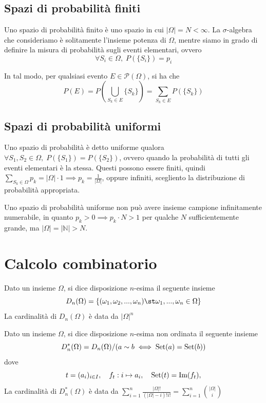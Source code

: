         \subsection{Spazi di probabilità finiti}
            Uno spazio di probabilità finito è uno spazio in cui $|\Omega| = N < \infty$.
            La $\sigma$-algebra che consideriamo è solitamente l'insieme potenza di $\Omega$, mentre siamo in grado di definire la misura di probabilità sugli eventi elementari, ovvero
            \[
                \forall S_{i} \in \Omega, \; P(\{S_{i}\}) = p_{i}
            \]

            In tal modo, per qualsiasi evento $E \in \mathcal{P}(\Omega)$, si ha che
            \[
                P(E) = P\left(\bigcup_{S_{k} \in E} \{S_{k}\}\right) = \sum_{S_{k} \in E} P(\{S_{k}\})
            \]

        \subsection{Spazi di probabilità uniformi}
            Uno spazio di probabilità è detto uniforme qualora $\forall S_{1}, S_{2} \in \Omega, \; P(\{S_{1}\}) = P(\{S_{2}\})$, ovvero quando la probabilità di tutti gli eventi elementari è la stessa.
            Questi possono essere finiti, quindi $\sum_{S_{k} \in \Omega} p_{k} = |\Omega| \cdot 1 \implies p_{k} = \frac{1}{|\Omega|}$, oppure infiniti, scegliento la distribuzione di probabilità appropriata.

            Uno spazio di probabilità uniforme non può avere insieme campione infinitamente numerabile, in quanto $p_{k} > 0 \implies p_{k} \cdot N > 1$ per qualche $N$ sufficientemente grande, ma $|\Omega| = |\mathbb{N}| > N$.



    \section{Calcolo combinatorio}
        \begin{definition}[Disposizione]
            Dato un insieme $\Omega$, si dice disposizione $n$-esima il seguente insieme
            \[
                D_{n}(\Omega) = \left\{ (\omega_{1}, \omega_{2}, ..., \omega_{n}) \st \omega_{1}, ..., \omega_{n} \in \Omega \right\}
            \]
            La cardinalità di $D_{n}(\Omega)$ è data da $|\Omega|^{n}$
        \end{definition}

        \begin{definition}
            Dato un insieme $\Omega$, si dice disposizione $n$-esima non ordinata il seguente insieme
            \[
                D^{*}_{n}(\Omega) = D_{n}(\Omega) / (a \sim b \iff \textnormal{Set}(a) = \textnormal{Set}(b))
            \]
            dove
            \[
                t = (a_{i})_{i \in I}, \quad f_{t}: i \mapsto a_{i}, \quad \textnormal{Set}(t) = \textnormal{Im}(f_{t}),
            \]
            La cardinalità di $D^{*}_{n}(\Omega)$ è data da $\displaystyle \sum_{i = 1}^{n} \frac{|\Omega|!}{(|\Omega| - i)! i!} = \sum_{i = 1}^{n} \binom{|\Omega|}{i}$
        \end{definition}

